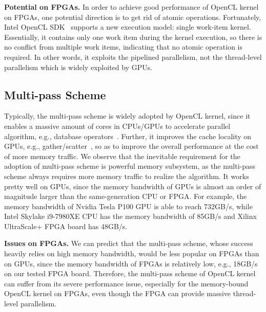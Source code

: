 {\bf Potential on FPGAs. }In order to achieve good performance of OpenCL kernel on FPGAs, one potential direction is to get rid of atomic operations. Fortunately, Intel OpenCL SDK~\cite{altera_optimization} supports a new execution model: single work-item kernel. Essentially, it contains only one work item during the kernel execution, so there is no conflict from multiple work items, indicating that no atomic operation is required. In other words, it exploits the pipelined parallelism, not the thread-level parallelism which is widely exploited by GPUs.

\subsection{Multi-pass Scheme}
Typically, the multi-pass scheme is widely adopted by OpenCL kernel, since it enables a massive amount of cores in CPUs/GPUs to accelerate parallel algorithm, e.g., database operators~\cite{query_gpu_tods09, omnidb_vldb13, query_openCL_fpga_fpl16}. Further, it improves the cache locality on GPUs, e.g., gather/scatter~\cite{gather_scatter_sc07}, so as to improve the overall performance at the cost of more memory traffic. We observe that the inevitable requirement for the adoption of multi-pass scheme is powerful memory subsystem, as the multi-pass scheme always requires more memory traffic to realize the algorithm. It works pretty well on GPUs, since the memory bandwidth of GPUs is almost an order of magnitude larger than the same-generation CPU or FPGA. For example, the memory bandwidth of Nvidia Tesla P100 GPU is able to reach 732GB/s, while Intel Skylake i9-7980XE CPU has the memory bandwidth of 85GB/s and Xilinx UltraScale+ FPGA board has 48GB/s. 

{\bf Issues on FPGAs. }We can predict that the multi-pass scheme, whose success heavily relies on high memory bandwidth, would be less popular on FPGAs than on GPUs, since the memory bandwidth of FPGAs is relatively low, e.g., 18GB/s on our tested FPGA board. Therefore, the multi-pass scheme of OpenCL kernel can suffer from its severe performance issue, especially for the memory-bound OpenCL kernel on FPGAs, even though the FPGA can provide massive thread-level parallelism. 

